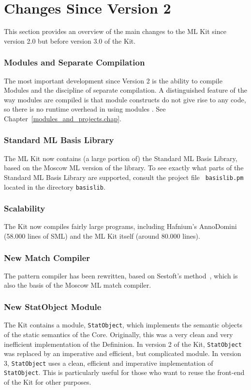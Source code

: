 \documentclass[12pt]{book}
\begin{document}
\section{Changes Since Version 2}
%
This section provides an overview of the main changes to the ML Kit
since version 2.0 but before version 3.0 of the Kit.

\subsubsection*{Modules and Separate Compilation}
The most important development since Version 2 is the ability to
compile Modules and the discipline of separate compilation. A
distinguished feature of the way modules are compiled is that module
constructs do not give rise to any code, so there is no runtime
overhead in using modules \cite{ElsmanICFP99,ElsmanThesis}. See
Chapter~\ref{modules_and_projects.chap}.

\subsubsection*{Standard ML Basis Library}
The ML Kit now contains (a large portion of) the  Standard ML Basis Library, based on the Moscow ML
version of the library. To see exactly what parts of the Standard ML
Basis Library are supported, consult the project file {\tt
  basislib.pm} located in the directory {\tt basislib}.

\subsubsection*{Scalability}
The Kit now compiles fairly large programs, including Hafnium's AnnoDomini
(58.000 lines of SML) and the ML Kit itself (around 80.000 lines).

\subsubsection*{New Match Compiler}
The pattern compiler has been rewritten, based on Sestoft's 
method~\cite{sestoft96}, which is also the basis of the Moscow ML 
match compiler. 

\subsubsection*{New StatObject Module}
The Kit contains a module, 
%
{\tt StatObject}, which implements the semantic objects of the static
semantics of the Core.  Originally, this was a very clean and very
inefficient implementation of the Defininion. In version 2 of the Kit,
{\tt StatObject} was replaced by an imperative and efficient, but
complicated module.  In version 3, {\tt StatObject} uses a clean,
efficient and imperative implementation of {\tt StatObject}. This is
particularly useful for those who want to reuse the front-end of the
Kit for other purposes.
\end{document}
